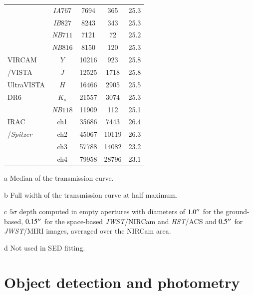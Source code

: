 \documentclass[longauth]{aa}
\begin{document}
\begin{table}[t!]
\begin{threeparttable}
\begin{tabular}{lcccc}
 & \textit{IA}$767$ & 7694 & 365 & 25.3  \\
 & \textit{IB}$827$ & 8243 & 343 & 25.3  \\
 & \textit{NB}$711$ & 7121 & 72 & 25.2  \\
 & \textit{NB}$816$ & 8150 & 120 & 25.3  \\
 \hline
VIRCAM & $Y$ & 10216 & 923 & 25.8  \\
/VISTA & $J$ & 12525 & 1718 & 25.8  \\
UltraVISTA & $H$ & 16466 & 2905 & 25.5  \\
DR6  & $K_s$ & 21557 & 3074 & 25.3  \\
 & \textit{NB}$118$\tnote{d} & 11909 & 112 & 25.1  \\
 \hline
 IRAC & ch1\tnote{d} & 35686 & 7443 & 26.4 \\
/\textit{Spitzer} & ch2\tnote{d} & 45067 & 10119 & 26.3 \\
 & ch3\tnote{d} & 57788 & 14082 & 23.2 \\
 & ch4\tnote{d} & 79958 & 28796 & 23.1 \\
 \hline
\end{tabular}
\begin{tablenotes}
\item[a] Median of the transmission curve.
\item[b] Full width of the transmission curve at half maximum.
\item[c] $5\sigma$ depth computed in empty apertures with diameters of $1.0\arcsecond$ for the ground-based, $0.15\arcsecond$ for the space-based \textit{JWST}/NIRCam and \textit{HST}/ACS and $0.5\arcsecond$ for \textit{JWST}/MIRI images, averaged over the NIRCam area.
\item[d] Not used in SED fitting. 
\end{tablenotes}
\end{threeparttable}

\label{tab:band_infos}
\end{table}


%

\section{Object detection and photometry} \label{sec:photometry-extraction}
\end{document}

